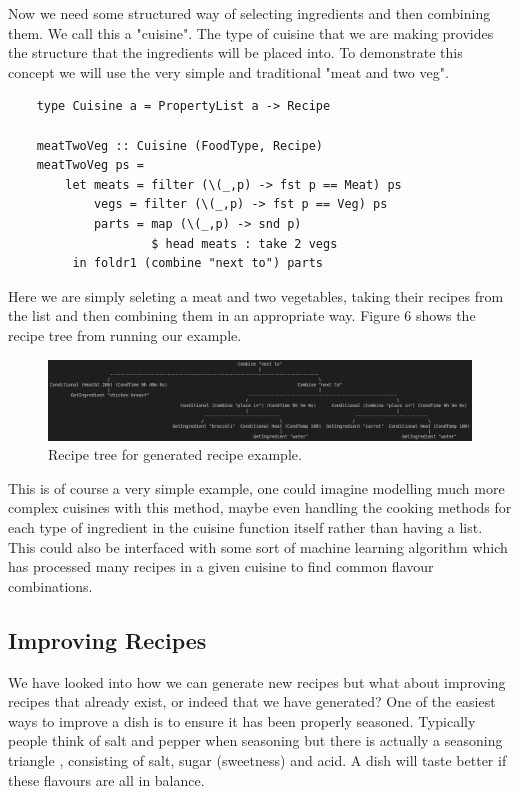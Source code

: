\documentclass[11pt]{article}
\begin{document}
Now we need some structured way of selecting ingredients and then combining
them. We call this a "cuisine". The type of cuisine that we are making provides
the structure that the ingredients will be placed into. To demonstrate this
concept we will use the very simple and traditional "meat and two veg".

\begin{lstlisting}
    type Cuisine a = PropertyList a -> Recipe

    meatTwoVeg :: Cuisine (FoodType, Recipe)
    meatTwoVeg ps =
        let meats = filter (\(_,p) -> fst p == Meat) ps
            vegs = filter (\(_,p) -> fst p == Veg) ps
            parts = map (\(_,p) -> snd p)
                    $ head meats : take 2 vegs
         in foldr1 (combine "next to") parts
\end{lstlisting}

Here we are simply seleting a meat and two vegetables, taking their
recipes from the list and then combining them in an appropriate way.
Figure 6 shows the recipe tree from running our example.

\newpage %

\begin{figure}[h]
\includegraphics[width=\textwidth, keepaspectratio]{meatTwoVeg.png}
\centering
\caption{Recipe tree for generated recipe example.}
\end{figure}

This is of course a very simple example, one could imagine modelling much more complex
cuisines with this method, maybe even handling the cooking methods for each type of
ingredient in the cuisine function itself rather than having a list. This could also
be interfaced with some sort of machine learning algorithm which has processed
many recipes in a given cuisine to find common flavour combinations.

\subsection{Improving Recipes}

We have looked into how we can generate new recipes but what about improving recipes
that already exist, or indeed that we have generated? One of the easiest ways to
improve a dish is to ensure it has been properly seasoned. Typically people think
of salt and pepper when seasoning but there is actually a seasoning triangle \cite{seasoning},
consisting of salt, sugar (sweetness) and acid. A dish will taste better if these
flavours are all in balance.
\end{document}
